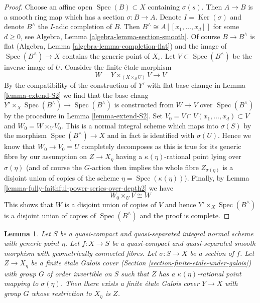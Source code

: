 \documentclass{stacks-project}
\theoremstyle{plain}
\newtheorem{lemma}[subsection]{Lemma}
\theoremstyle{definition}
\theoremstyle{remark}
\numberwithin{equation}{subsection}
\def\Spec{\mathop{\mathrm{Spec}}}
\def\Ker{\mathop{\mathrm{Ker}}}
\begin{document}
\begin{proof}
\medskip\noindent
Choose an affine open $\Spec(B) \subset X$ containing $\sigma(s)$.
Then $A \to B$ is a smooth ring map which has a section $\sigma : B \to A$.
Denote $I = \Ker(\sigma)$ and denote $B^\wedge$ the
$I$-adic completion of $B$. Then $B^\wedge \cong A[[x_1, \ldots, x_d]]$
for some $d \geq 0$, see
Algebra, Lemma \ref{algebra-lemma-section-smooth}.
Of course $B \to B^\wedge$ is flat
(Algebra, Lemma \ref{algebra-lemma-completion-flat})
and the image of $\Spec(B^\wedge) \to X$ contains the generic point of $X_s$.
Let $V \subset \Spec(B^\wedge)$ be the inverse image of $U$.
Consider the finite \'etale morphism
$$
W = Y \times_{(X \times_S U)} V \longrightarrow V
$$
By the compatibility of the construction of $Y'$
with flat base change in Lemma \ref{lemma-extend-S2}
we find that the base chang
$Y' \times_X \Spec(B^\wedge) \to \Spec(B^\wedge)$
is constructed from $W \to V$ over $\Spec(B^\wedge)$
by the procedure in Lemma \ref{lemma-extend-S2}.
Set $V_0 = V \cap V(x_1, \ldots, x_d) \subset V$ and $W_0 = W \times_V V_0$.
This is a normal integral scheme which maps into $\sigma(S)$
by the morphism $\Spec(B^\wedge) \to X$ and in fact is identified
with $\sigma(U)$. Hence we know that $W_0 \to V_0 = U$ completely decomposes
as this is true for its generic fibre by our assumption
on $Z \to X_\eta$ having a $\kappa(\eta)$-rational point lying over
$\sigma(\eta)$ (and of course the $G$-action then implies the whole
fibre $Z_{\sigma(\eta)}$ is a disjoint union of copies of
the scheme $\eta = \Spec(\kappa(\eta))$).
Finally, by
Lemma \ref{lemma-fully-faithful-power-series-over-depth2}
we have
$$
W_0 \times_U V \cong W
$$
This shows that $W$ is a disjoint union of copies of $V$
and hence $Y' \times_X \Spec(B^\wedge)$ is a disjoint
union of copies of $\Spec(B^\wedge)$ and the proof is complete.
\end{proof}

\begin{lemma}
\label{lemma-extend-covering-general}
Let $S$ be a quasi-compact and quasi-separated integral normal scheme
with generic point $\eta$. Let $f : X \to S$ be a quasi-compact and
quasi-separated smooth morphism with geometrically connected fibres.
Let $\sigma : S \to X$ be a section of $f$. Let $Z \to X_\eta$ be a
finite \'etale Galois cover (Section \ref{section-finite-etale-under-galois})
with group $G$ of order invertible on $S$ such that
$Z$ has a $\kappa(\eta)$-rational point mapping to $\sigma(\eta)$.
Then there exists a finite \'etale Galois cover $Y \to X$ with group $G$
whose restriction to $X_\eta$ is $Z$.
\end{lemma}
\end{document}
